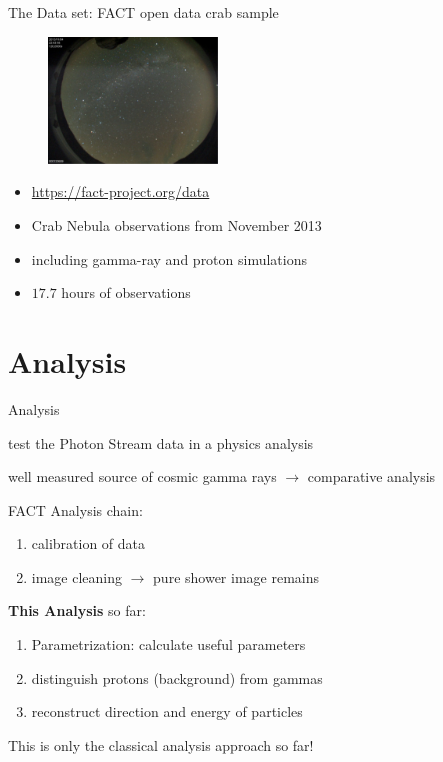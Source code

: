\begin{frame}[t]{The Data set: FACT open data crab sample}
    \begin{multicols}{2}
        \begin{figure}
            \centering
            \includegraphics[width=0.4\textwidth]{fig/cond.png}
        \end{figure}
    \columnbreak
    \vspace*{\fill}
        \begin{itemize}
            \item \url{https://fact-project.org/data}
            \item Crab Nebula observations from November 2013
            \item including gamma-ray and proton simulations
            \item $17.7$ hours of observations
        \end{itemize}
    \vspace*{\fill}
  \end{multicols}
\end{frame}

\section{Analysis}

\begin{frame}[t]{Analysis}
\begin{description}
    \item[aim] test the Photon Stream data in a physics analysis
    \item[Crab Nebula] well measured source of cosmic gamma rays $\rightarrow$ comparative analysis
\end{description}
FACT Analysis chain:
    \begin{enumerate}
        \item calibration of data
        \item image cleaning $\rightarrow$ pure shower image remains
    \end{enumerate}
\textbf{{\color{tugreen} This Analysis}} so far:
    \begin{enumerate}\addtocounter{enumi}{2}
        \item Parametrization: calculate useful parameters
        \item distinguish protons (background) from gammas
        \item reconstruct direction and energy of particles
    \end{enumerate}
\begin{framed}
    \centering
    This is only the classical analysis approach so far!
\end{framed}
\end{frame}

